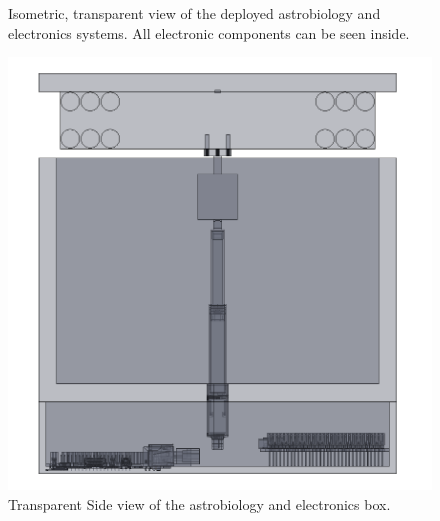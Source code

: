 \begin{centering}
\begin{figure}[h]
    \caption{Isometric, transparent view of the deployed astrobiology and electronics systems. All electronic components can be seen inside.}
    \label{fig:astrobio-electronics-image}
  \end{figure}
  \begin{figure}[h]
    \includegraphics[width=\textwidth]{Figures/astrobio-electronics-deployed-transparent-sideview.png}
    \caption{Transparent Side view of the astrobiology and electronics box.}
    \label{fig:astrobio-electronics-image-sideview}
  \end{figure}


\end{centering}
